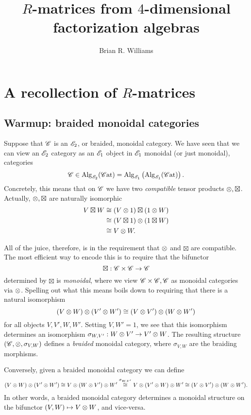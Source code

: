\documentclass[11pt]{amsart}
\title{$R$-matrices from $4$-dimensional factorization algebras}
\author{Brian R. Williams}
\date{}
\begin{document}
\maketitle

\section{A recollection of $R$-matrices}

\subsection{Warmup: braided monoidal categories}

Suppose that $\mathscr C$ is an $\mathscr E_2$, or braided, monoidal category.
We have seen that we can view an $\mathscr E_2$ category as an $\mathscr E_1$ object in $\mathscr E_1$ monoidal (or just monoidal), categories
\[
\mathscr C \in {\rm Alg}_{\mathscr E_2} (\mathscr C{\rm at}) = {\rm Alg}_{\mathscr E_1} \left({\rm Alg}_{\mathscr E_1} (\mathscr C{\rm at}) \right) .
\]
Concretely, this means that on $\mathscr C$ we have two {\em compatible} tensor products $\otimes, \boxtimes$.
Actually, $\otimes, \boxtimes$ are naturally isomorphic
\begin{align*}
V \boxtimes W & \cong (V \otimes 1) \boxtimes (1 \otimes W) \\ & \cong (V \boxtimes 1) \otimes (1 \boxtimes W) \\ & \cong V \otimes W .
\end{align*}

All of the juice, therefore, is in the requirement that $\otimes$ and $\boxtimes$ are compatible. 
The most efficient way to encode this is to require that the bifunctor
\[
\boxtimes : \mathscr C \times \mathscr C \to \mathscr C
\]
determined by $\boxtimes$ is {\em monoidal}, where we view $\mathscr C \times \mathscr C, \mathscr C$ as monoidal categories via $\otimes$. 
Spelling out what this means boils down to requiring that there is a natural isomorphism
\[
(V \otimes W) \otimes (V' \otimes W') \cong (V \otimes V') \otimes (W \otimes W')
\]
for all objects $V,V',W,W'$.
Setting $V, W'= 1$, we see that this isomorphism determines an isomorphism $\sigma_{W, V'} : W \otimes V' \to V' \otimes W$.
The resulting structure $(\mathscr C, \otimes, \sigma_{V,W})$ defines a {\em braided} monoidal category, where $\sigma_{V,W}$ are the braiding morphisms.

Conversely, given a braided monoidal category we can define
\[
(V \otimes W) \otimes (V' \otimes W') \cong V \otimes (W \otimes V') \otimes W'  \overset{\sigma_{W, V'}}{\cong} V \otimes (V' \otimes W) \otimes W' \cong (V \otimes V') \otimes (W \otimes W') .
\]
In other words, a braided monoidal category determines a monoidal structure on the bifunctor $(V,W) \mapsto V \otimes W$, and vice-versa. 
\end{document}
